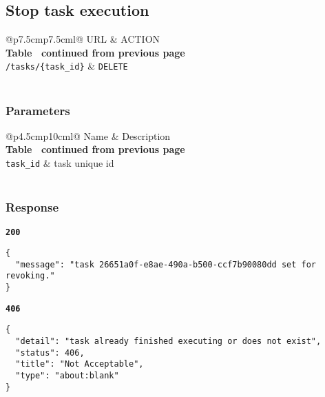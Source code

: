 \subsection{Stop task execution}

\begin{longtable}[c]{@{}p{7.5cm}p{7.5cm}l@{}}
  \toprule
  URL                          & ACTION                       \\* \midrule
  \endfirsthead
  \multicolumn{3}{c}%
  {{\bfseries Table \thetable\ continued from previous page}} \\
  \endhead
  \bottomrule
  \endfoot
  \endlastfoot
  \texttt{/tasks/\{task\_id\}} & \texttt{DELETE}              \\* \bottomrule
  \label{tab:rdf-fingerprinter-delete-task}                       \\
\end{longtable}

\subsubsection{Parameters}
\begin{longtable}[c]{@{}p{4.5cm}p{10cm}l@{}}
  \toprule
  Name              & Description                             \\* \midrule
  \endfirsthead
  \multicolumn{3}{c}%
  {{\bfseries Table \thetable\ continued from previous page}} \\
  \endhead
  \bottomrule
  \endfoot
  \endlastfoot
  \texttt{task\_id} & task unique id                          \\* \bottomrule
  \label{tab:rdf-fingerprinter-delete-task-parameters}            \\
\end{longtable}

\subsubsection{Response}
\textbf{\texttt{200}}
\begin{lstlisting}
{
  "message": "task 26651a0f-e8ae-490a-b500-ccf7b90080dd set for revoking."
}
\end{lstlisting}

\textbf{\texttt{406}}
\begin{lstlisting}
{
  "detail": "task already finished executing or does not exist",
  "status": 406,
  "title": "Not Acceptable",
  "type": "about:blank"
}
\end{lstlisting}
